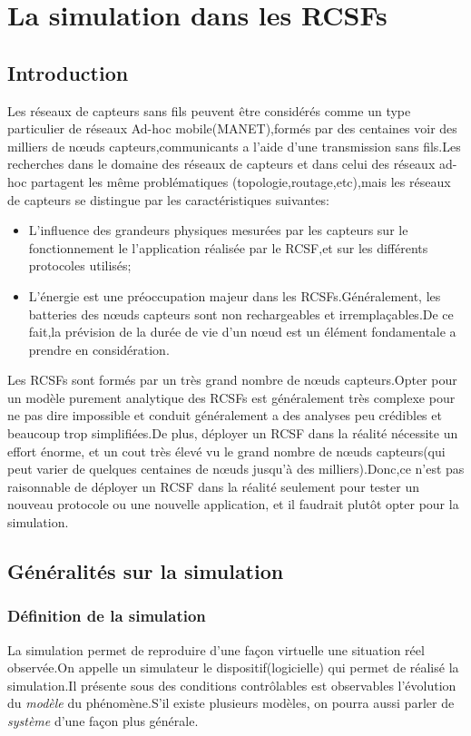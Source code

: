 
\chapter{La simulation dans les RCSFs}
\section{Introduction}
Les réseaux de capteurs sans fils peuvent être considérés comme un type particulier de réseaux Ad-hoc mobile(MANET),formés par des  centaines voir des milliers de nœuds capteurs,communicants a l'aide d'une transmission sans fils.Les recherches dans le domaine des réseaux de capteurs et dans celui des réseaux ad-hoc partagent les même problématiques (topologie,routage,etc),mais les réseaux de capteurs se distingue par les caractéristiques suivantes:
\begin{itemize}
\item L'influence des grandeurs physiques mesurées par les capteurs sur le fonctionnement le l'application réalisée par le RCSF,et sur les différents protocoles utilisés; 
\item L'énergie est une préoccupation majeur dans les RCSFs.Généralement, les batteries des nœuds capteurs sont non rechargeables et irremplaçables.De ce fait,la prévision de la durée de vie d'un nœud est un élément fondamentale a prendre en considération.
\end{itemize}

Les RCSFs sont formés par un très grand nombre de nœuds capteurs.Opter pour un modèle
 purement analytique des RCSFs est généralement très complexe pour ne pas dire impossible et conduit généralement a des analyses peu crédibles et beaucoup trop simplifiées.De plus, déployer un RCSF dans la réalité nécessite un effort énorme, et un cout très élevé vu le grand nombre de nœuds capteurs(qui peut varier de quelques centaines de nœuds jusqu'à des milliers).Donc,ce n'est pas raisonnable de déployer un RCSF dans la réalité seulement pour tester un nouveau protocole ou une nouvelle application, et il faudrait plutôt opter pour la simulation.   
 
\section{Généralités sur la simulation}
\subsection{Définition de la simulation }
La simulation permet de reproduire d'une façon virtuelle une situation réel observée.On appelle un simulateur le dispositif(logicielle) qui permet de réalisé la simulation.Il présente sous des conditions contrôlables est observables l'évolution du \emph{modèle} du phénomène.S'il existe plusieurs modèles, on pourra aussi parler de \emph{système} d'une façon plus générale.

